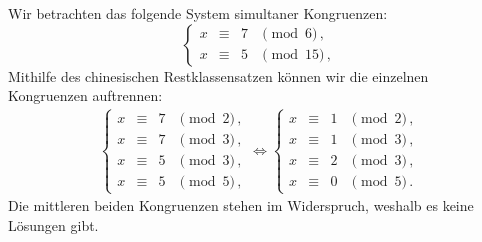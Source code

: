 \begin{example}
  Wir betrachten das folgende System simultaner Kongruenzen:
  \[
    \left\{
      \begin{array}{ccll}
        x &\equiv&  7 & \pmod{6}  \,, \\
        x &\equiv&  5 & \pmod{15} \,,
      \end{array}
    \right.
  \]
  Mithilfe des chinesischen Restklassensatzen können wir die einzelnen Kongruenzen auftrennen:
  \begin{align*}
          \left\{
            \begin{array}{ccll}
              x &\equiv&  7 & \pmod{2}  \,, \\
              x &\equiv&  7 & \pmod{3}  \,, \\
              x &\equiv&  5 & \pmod{3}  \,, \\
              x &\equiv&  5 & \pmod{5} \,,
            \end{array}
          \right.
    \iff  \left\{
            \begin{array}{ccll}
              x &\equiv&  1 & \pmod{2}  \,, \\
              x &\equiv&  1 & \pmod{3}  \,, \\
              x &\equiv&  2 & \pmod{3}  \,, \\
              x &\equiv&  0 & \pmod{5} \,.
            \end{array}
          \right.
  \end{align*}
  Die mittleren beiden Kongruenzen stehen im Widerspruch, weshalb es keine Lösungen gibt.
\end{example}

